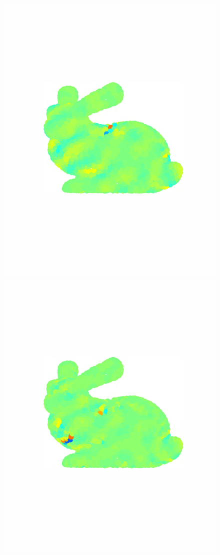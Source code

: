 \documentclass{article}
\begin{document}
\begin{figure}[bth]
\begin{minipage}[m]{0.16\linewidth}
\end{minipage}
\begin{minipage}[m]{0.16\linewidth}
\centerline{\includegraphics[width=.8\linewidth]{fig_bunny_rec_wav1}}
\end{minipage}
\begin{minipage}[m]{0.16\linewidth}
\centerline{\includegraphics[width=.8\linewidth]{fig_bunny_rec_wav2}}

\end{minipage}
\end{figure}
\end{document}

